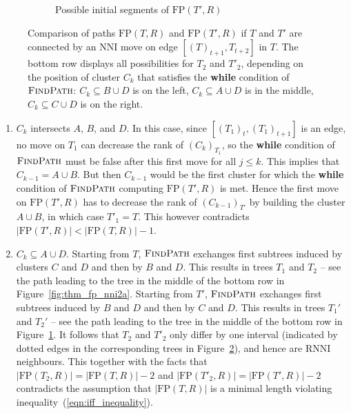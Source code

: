 \documentclass[11pt]{amsart}
\newcommand{\rnni}{\mathrm{RNNI}}
\newcommand{\findpath}{\textsc{FindPath}}
\newcommand{\nni}{\mathrm{NNI}}
\newcommand{\fp}{\mathrm{FP}}
\begin{document}
\begin{enumerate}[label = 1.{\arabic*}]
\begin{figure}[ht]
\begin{subfigure}[b]{.45\textwidth}
		\vspace{12pt}
		\caption{Possible initial segments of $\fp(T', R)$}
		\label{fig:thm_fp_nni2b}
	\end{subfigure}
	\caption{Comparison of paths $\fp(T, R)$ and $\fp(T', R)$ if $T$ and $T'$ are connected by an $\nni$ move on edge $[(T)_{t+1},T_{t+2}]$ in $T$.
	The bottom row displays all possibilities for $T_2$ and $T'_2$, depending on the position of cluster $C_k$ that satisfies the \textbf{while} condition of $\findpath$:
	${C_k \subseteq B \cup D}$ is on the left, ${C_k \subseteq A \cup D}$ is in the middle, ${C_k \subseteq C \cup D}$ is on the right.}
	\label{fig:thm_fp_nni}
\end{figure}

\begin{enumerate}[label = \theenumi.\arabic*]
\item $C_k$ intersects $A$, $B$, and $D$.
In this case, since $[(T_1)_t, (T_1)_{t+1}]$ is an edge, no move on $T_1$ can decrease the rank of $(C_k)_{T_1}$, so the \textbf{while} condition of $\findpath$ must be false after this first move for all $j \leq k$.
This implies that $C_{k-1} = A \cup B$.
But then $C_{k-1}$ would be the first cluster for which the \textbf{while} condition of $\findpath$ computing $\fp(T', R)$ is met.
Hence the first move on $\fp(T', R)$ has to decrease the rank of $(C_{k-1})_{T'}$ by building the cluster $A \cup B$, in which case $T'_1 = T$.
This however contradicts $|\fp(T',R)| < |\fp(T,R)| - 1$.

\item $C_k \subseteq A \cup D$.
\label{deep_case_details}
Starting from $T$, $\findpath$ exchanges first subtrees induced by clusters $C$ and $D$ and then by $B$ and $D$.
This results in trees $T_1$ and $T_2$ -- see the path leading to the tree in the middle of the bottom row in Figure~\ref{fig:thm_fp_nni2a}.
Starting from $T'$, $\findpath$ exchanges first subtrees induced by $B$ and $D$ and then by $C$ and $D$.
This results in trees $T_1'$ and $T_2'$ -- see the path leading to the tree in the middle of the bottom row in Figure~\ref{fig:thm_fp_nni2b}.
It follows that $T_2$ and $T'_2$ only differ by one interval (indicated by dotted edges in the corresponding trees in Figure~\ref{fig:thm_fp_nni}), and hence are $\rnni$ neighbours.
This together with the facts that $|\fp(T_2,R)| = |\fp(T,R)|-2$ and $|\fp(T'_2,R)| = |\fp(T',R)|-2$ contradicts the assumption that $|\fp(T,R)|$ is a minimal length violating inequality~(\ref{eqn:iff_inequality}).


\end{enumerate}
\end{enumerate}
\end{document}

